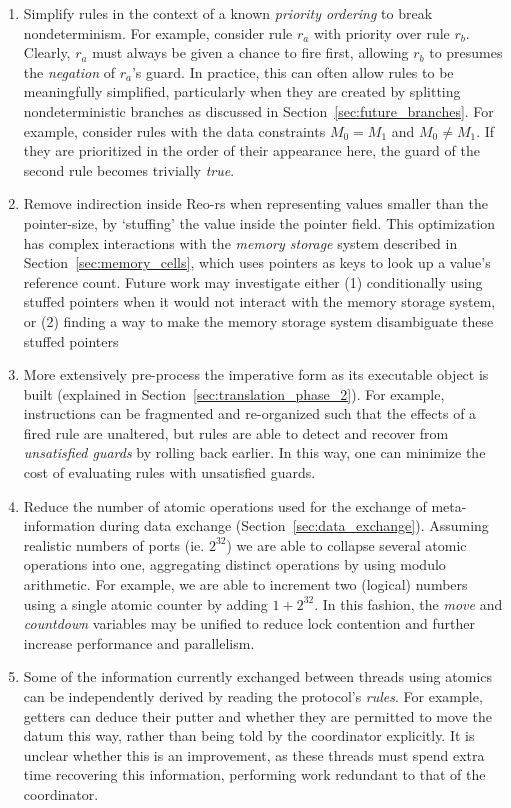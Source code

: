 \begin{enumerate}
	\item Simplify rules in the context of a known \textit{priority ordering} to break nondeterminism. For example, consider rule $r_a$ with priority over rule $r_b$. Clearly, $r_a$ must always be given a chance to fire first, allowing $r_b$ to presumes the \textit{negation} of $r_a$'s guard. In practice, this can often allow rules to be meaningfully simplified, particularly when they are created by splitting nondeterministic branches as discussed in Section~\ref{sec:future_branches}. For example, consider rules with the data constraints $M_0=M_1$ and $M_0\neq{}M_1$. If they are prioritized in the order of their appearance here, the guard of the second rule becomes trivially \textit{true}.
	
	\item Remove indirection inside Reo-rs when representing values smaller than the pointer-size, by `stuffing' the value inside the pointer field. This optimization has complex interactions with the \textit{memory storage} system described in Section~\ref{sec:memory_cells}, which uses pointers as keys to look up a value's reference count. Future work may investigate either (1) conditionally using stuffed pointers when it would not interact with the memory storage system, or (2) finding a way to make the memory storage system disambiguate these stuffed pointers
	
	
	\item More extensively pre-process the imperative form as its executable object is built (explained in Section~\ref{sec:translation_phase_2}). For example, instructions can be fragmented and re-organized such that the effects of a fired rule are unaltered, but rules are able to detect and recover from \textit{unsatisfied guards} by rolling back earlier. In this way, one can minimize the cost of evaluating rules with unsatisfied guards.
	
	\item Reduce the number of atomic operations used for the exchange of meta-information during data exchange (Section~\ref{sec:data_exchange}). Assuming realistic numbers of ports (ie. $2^{32}$) we are able to collapse several atomic operations into one, aggregating distinct operations by using modulo arithmetic. For example, we are able to increment two (logical) numbers using a single atomic counter by adding $1 + 2^{32}$. In this fashion, the \textit{move} and \textit{countdown} variables may be unified to reduce lock contention and further increase performance and parallelism.
	
	\item Some of the information currently exchanged between threads using atomics can be independently derived by reading the protocol's \textit{rules}. For example, getters can deduce their putter and whether they are permitted to move the datum this way, rather than being told by the coordinator explicitly. It is unclear whether this is an improvement, as these threads must spend extra time recovering this information, performing work redundant to that of the coordinator. 
\end{enumerate}
